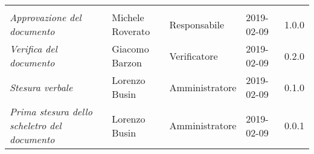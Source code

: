 \newpage 
\section*{}
\begin{table}[H]
	\centering
	\begin{tabular}{p{4cm}|C{3cm}|C{3cm}|R{2.5cm}|R{2cm}}
		
		 & & & & \\
		
		
		\emph{Approvazione del documento} & Michele Roverato & Responsabile & 2019-02-09 & 1.0.0 \\
		\hline
		
		\emph{Verifica del documento} & Giacomo Barzon & Verificatore & 2019-02-09 & 0.2.0 \\
		\hline

		\emph{Stesura verbale} & Lorenzo Busin & Amministratore & 2019-02-09 & 0.1.0 \\
		\hline
		
		\emph{Prima stesura dello scheletro del documento} & Lorenzo Busin & Amministratore & 2019-02-09 & 0.0.1 \\
		
	\end{tabular}
	
\end{table}


\clearpage